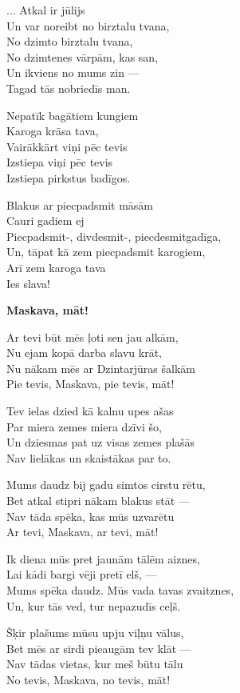 \documentclass[11pt]{article}
\begin{document}
... Atkal ir jūlijs\\
Un var noreibt no birztalu tvana,\\
No dzimto birztalu tvana,\\
No dzimtenes vārpām, kas san,\\
Un ikviens no mums zin ---\\
Tagad tās nobriedīs man.

Nepatīk bagātiem kungiem\\
Karoga krāsa tava,\\
Vairākkārt viņi pēc tevis\\
Izstiepa viņi pēc tevis\\
Izstiepa pirkstus badīgos.

Blakus ar piecpadsmit māsām\\
Cauri gadiem ej\\
Piecpadsmit-, divdesmit-, piecdesmitgadīga,\\
Un, tāpat kā zem piecpadsmit karogiem,\\
Arī zem karoga tava\\
Ies slava!

\newpage

{\bf Maskava, māt!}

Ar tevi būt mēs ļoti sen jau alkām,\\
Nu ejam kopā darba slavu krāt,\\
Nu nākam mēs ar Dzintarjūras šalkām\\
Pie tevis, Maskava, pie tevis, māt!

Tev ielas dzied kā kalnu upes ašas\\
Par miera zemes miera dzīvi šo,\\
Un dziesmas pat uz visas zemes plašās\\
Nav lielākas un skaistākas par to.

Mums daudz bij gadu simtos cirstu rētu,\\
Bet atkal stipri nākam blakus stāt ---\\
Nav tāda spēka, kas mūs uzvarētu\\
Ar tevi, Maskava, ar tevi, māt!

Ik diena mūs pret jaunām tālēm aiznes,\\
Lai kādi bargi vēji pretī elš, ---\\
Mums spēka daudz. Mūs vada tavas zvaitznes,\\
Un, kur tās ved, tur nepazudīs ceļš.

Šķir plašums mūsu upju viļņu vālus,\\
Bet mēs ar sirdi pieaugām tev klāt ---\\
Nav tādas vietas, kur meš būtu tālu\\
No tevis, Maskava, no tevis, māt!
\end{document}
